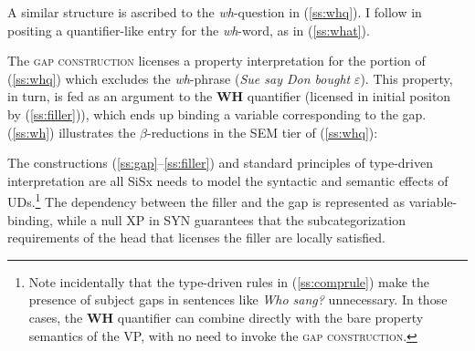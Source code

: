 \documentclass[output=paper,hidelinks]{langscibook}
\begin{document}
A similar structure is ascribed to the \textit{wh}-question in (\ref{ss:whq}). I follow \citet{culicover2019origin} in positing a quantifier-like entry for the \textit{wh}-word, as in (\ref{ss:what}).

\begin{exe}
\label{ss:whq}
\end{exe}





The \textsc{gap construction} licenses a property interpretation for the portion of (\ref{ss:whq}) which excludes the \textit{wh}-phrase (\textit{Sue say Don bought} $\varepsilon$). This property, in turn, is fed as an argument to the \textbf{WH} quantifier (licensed in initial positon by (\ref{ss:filler})), which ends up binding a variable corresponding to the gap. (\ref{ss:wh}) illustrates the $\beta$-reductions in the SEM tier of (\ref{ss:whq}):

\begin{exe}
 \label{ss:wh}
\end{exe}


The constructions (\ref{ss:gap}--\ref{ss:filler}) and standard principles of type-driven interpretation are all SiSx needs to model the syntactic and semantic effects of UDs.\footnote{Note incidentally that the type-driven rules in (\ref{ss:comprule}) make the presence of subject gaps in sentences like \textit{Who sang?} unnecessary. In those cases, the \textbf{WH} quantifier can combine directly with the bare property semantics of the VP, with no need to invoke the \textsc{gap construction}.} The dependency between the filler and the gap is represented as variable-binding, while a null XP in SYN guarantees that the subcategorization requirements of the head that licenses the filler are locally satisfied.
\end{document}
